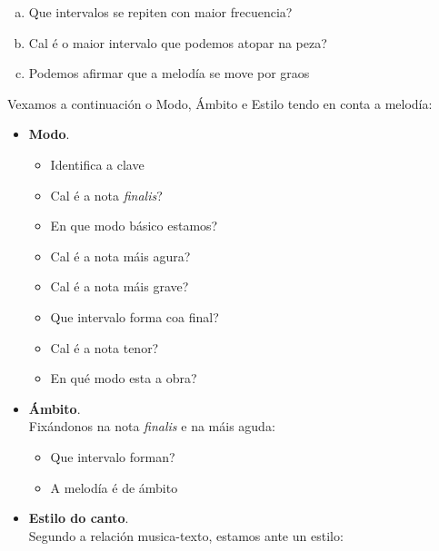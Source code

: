 \begin{multicols}{2}
\begin{enumerate}[1.-]
        \begin{enumerate}[a)]
            \item 
            Que intervalos se repiten con maior frecuencia? \dotfill
            \item 
            Cal é o maior intervalo que podemos atopar na peza? \dotfill
            \item
            Podemos afirmar que a melodía se move por graos \dotfill
        \end{enumerate}
        Vexamos a continuación o Modo, Ámbito e Estilo tendo en conta a melodía:
        \begin{itemize}
            \item %
            \textbf{Modo}.
        \begin{itemize}            
            \item 
            Identifica a clave \dotfill
            \item 
            Cal é a nota \textit{finalis}? \dotfill
            \item
            En que modo básico estamos? \dotfill
            \item
            Cal é a nota máis agura? \dotfill 
            \item
            Cal é a nota máis grave? \dotfill 
            \item
            Que intervalo forma coa final? \dotfill
            \item
            Cal é a nota tenor? \dotfill 
            \item
            En qué modo esta a obra? \dotfill
       \end{itemize}
            \item %
            \textbf{Ámbito}. \\
            Fixándonos na nota \textit{finalis} e na máis aguda:
                \begin{itemize}
                    \item
                    Que intervalo forman? \dotfill
                    \item
                    A melodía é de ámbito \dotfill
                \end{itemize}
            \item %
            \textbf{Estilo do canto}. \\ Segundo a relación musica-texto, estamos ante un estilo:

\end{itemize}
\end{enumerate}
\end{multicols}
